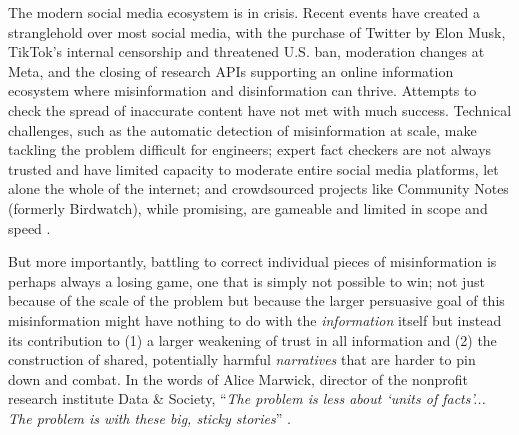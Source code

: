 \documentclass{article} %
\begin{document}


The modern social media ecosystem is in crisis.
Recent events have created a stranglehold over most social media, with the purchase of Twitter by Elon Musk, TikTok's internal censorship and threatened U.S. ban, moderation changes at Meta, and the closing of research APIs supporting an online information ecosystem where misinformation and disinformation can thrive.
Attempts to check the spread of inaccurate content have not met with much success.
Technical challenges, such as the automatic detection of misinformation at scale, make tackling the problem difficult for engineers; expert fact checkers are not always trusted and have limited capacity to moderate entire social media platforms, let alone the whole of the internet; and crowdsourced projects like Community Notes (formerly Birdwatch), while promising, are gameable and limited in scope and speed \citep{wojcik2022birdwatchcrowdwisdombridging,allen2022birds,borenstein2025communitynotesreplaceprofessional}.

But more importantly, battling to correct individual pieces of misinformation is perhaps always a losing game, one that is simply not possible to win; not just because of the scale of the problem but because the larger persuasive goal of this misinformation might have nothing to do with the \textit{information} itself but instead its contribution to (1) a larger weakening of trust in all information and (2) the construction of shared, potentially harmful \textit{narratives} that are harder to pin down and combat.
In the words of Alice Marwick, director of the nonprofit research institute Data \& Society, ``\textit{The problem is less about `units of facts'... The problem is with these big, sticky stories}'' \citep{clarke2025nobody}.
\end{document}
